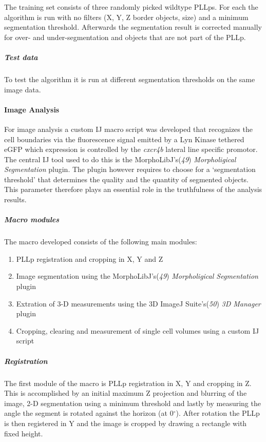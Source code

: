 \documentclass[11pt,singlespacinge,twoside]{reedthesis} %
\providecommand{\tightlist}{%
  \setlength{\itemsep}{0pt}\setlength{\parskip}{0pt}}
\begin{document}
The training set consists of three randomly picked wildtype PLLps. For each the algorithm is run with no filters (X, Y, Z border objects, size) and a minimum segmentation threshold. Afterwards the segmentation result is corrected manually for over- and under-segmentation and objects that are not part of the PLLp.

\hypertarget{test-data-1}{%
\subparagraph{Test data}\label{test-data-1}}

To test the algorithm it is run at different segmentation thresholds on the same image data.

\hypertarget{image-analysis-1}{%
\paragraph{Image Analysis}\label{image-analysis-1}}

For image analysis a custom IJ macro script was developed that recognizes the cell boundaries via the fluorescence signal emitted by a Lyn Kinase tethered eGFP which expression is controlled by the \emph{cxcr4b} lateral line specific promotor. The central IJ tool used to do this is the MorphoLibJ's(\emph{49}) \emph{Morpholigical Segmentation} plugin. The plugin however requires to choose for a `segmentation threshold' that determines the quality and the quantity of segmented objects. This parameter therefore plays an essential role in the truthfulness of the analysis results.

\hypertarget{macro-modules-1}{%
\subparagraph{Macro modules}\label{macro-modules-1}}

The macro developed consists of the following main modules:
\begin{enumerate}
\def\labelenumi{\arabic{enumi}.}
\tightlist
\item
  PLLp registration and cropping in X, Y and Z
\item
  Image segmentation using the MorphoLibJ's(\emph{49}) \emph{Morpholigical Segmentation} plugin
\item
  Extration of 3-D measurements using the 3D ImageJ Suite's(\emph{50}) \emph{3D Manager} plugin
\item
  Cropping, clearing and measurement of single cell volumes using a custom IJ script
\end{enumerate}
\hypertarget{registration}{%
\subparagraph{Registration}\label{registration}}

The first module of the macro is PLLp registration in X, Y and cropping in Z. This is accomplished by an initial maximum Z projection and blurring of the image, 2-D segmentation using a minimum threshold and lastly by measuring the angle the segment is rotated against the horizon (at 0\(^{\circ}\)). After rotation the PLLp is then registered in Y and the image is cropped by drawing a rectangle with fixed height.
\end{document}
